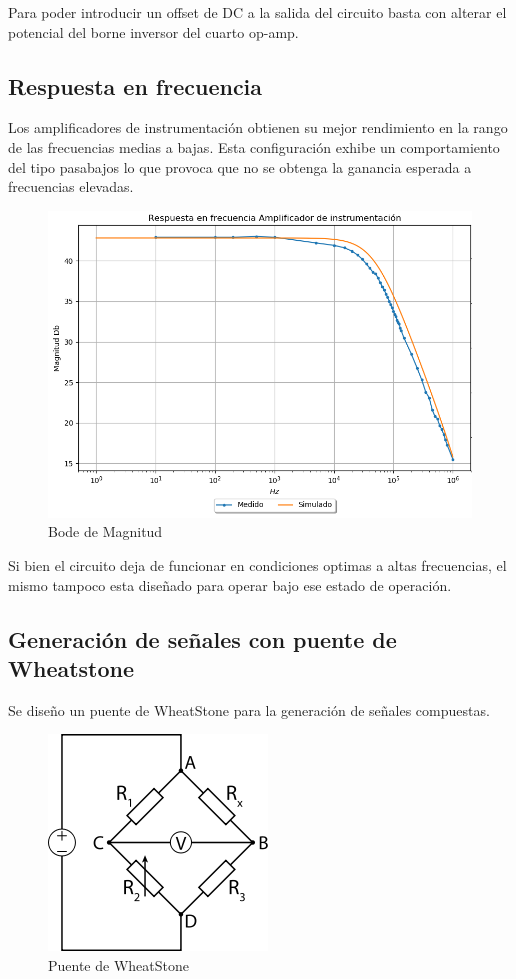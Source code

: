 Para poder introducir un offset de DC a la salida del circuito basta con alterar el potencial del borne inversor del cuarto op-amp.


\subsection{Respuesta en frecuencia}
Los amplificadores de instrumentación obtienen su mejor rendimiento en la rango de las frecuencias medias a bajas. Esta configuración exhibe un comportamiento del tipo pasabajos lo que provoca que no se obtenga la ganancia esperada a frecuencias elevadas.
\begin{figure}[H]
	\centering
	\includegraphics[height=0.3\textheight]{./ImagenesVarias/BODE_MAG.PNG}
	\caption{Bode de Magnitud}
\end{figure}

Si bien el circuito deja de funcionar en condiciones optimas a altas frecuencias, el mismo tampoco esta diseñado para operar bajo ese estado de operación.

  
\subsection{Generación de señales con puente de Wheatstone}
Se diseño un puente de WheatStone para la generación de señales compuestas.
\begin{figure}[H]
	\centering
	\includegraphics[height=0.25\textheight]{./ImagenesVarias/wheatstone.png}
	\caption{Puente de WheatStone}
\end{figure}

